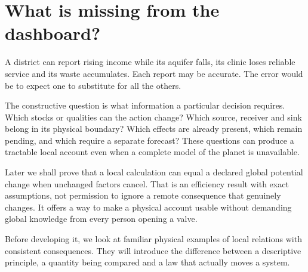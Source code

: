 \section{What is missing from the dashboard?}
A district can report rising income while its aquifer falls, its clinic loses reliable service and its waste accumulates. Each report may be accurate. The error would be to expect one to substitute for all the others.

The constructive question is what information a particular decision requires. Which stocks or qualities can the action change? Which source, receiver and sink belong in its physical boundary? Which effects are already present, which remain pending, and which require a separate forecast? These questions can produce a tractable local account even when a complete model of the planet is unavailable.

Later we shall prove that a local calculation can equal a declared global potential change when unchanged factors cancel. That is an efficiency result with exact assumptions, not permission to ignore a remote consequence that genuinely changes. It offers a way to make a physical account usable without demanding global knowledge from every person opening a valve.

Before developing it, we look at familiar physical examples of local relations with consistent consequences. They will introduce the difference between a descriptive principle, a quantity being compared and a law that actually moves a system.
